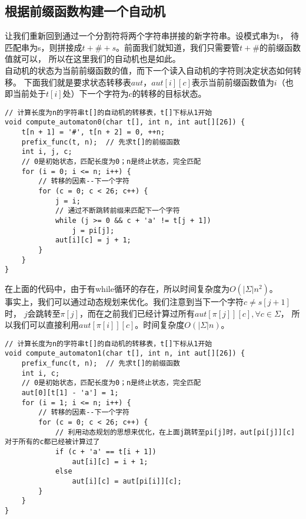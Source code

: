     \subsection{根据前缀函数构建一个自动机}
        让我们重新回到通过一个分割符将两个字符串拼接的新字符串。设模式串为t，
        待匹配串为s，则拼接成$t+\#+s$。前面我们就知道，我们只需要管$t+\#$的前缀函数值就可以，
        所以在这里我们的自动机也是如此。\\
        自动机的状态为当前前缀函数的值，而下一个读入自动机的字符则决定状态如何转移。
        下面我们就是要求状态转移表$aut$，$aut[i][c]$表示当前前缀函数值为$i$（也
        即当前处于$t[i]$处）下一个字符为$c$的转移的目标状态。
        \begin{lstlisting}
// 计算长度为n的字符串t[]的自动机的转移表，t[]下标从1开始
void compute_automaton0(char t[], int n, int aut[][26]) {
    t[n + 1] = '#', t[n + 2] = 0, ++n;
    prefix_func(t, n);  // 先求t[]的前缀函数
    int i, j, c;
    // 0是初始状态，匹配长度为0；n是终止状态，完全匹配
    for (i = 0; i <= n; i++) {
        // 转移的因素--下一个字符
        for (c = 0; c < 26; c++) {
            j = i;
            // 通过不断跳转前缀来匹配下一个字符
            while (j >= 0 && c + 'a' != t[j + 1])
                j = pi[j];
            aut[i][c] = j + 1;
        }
    }
}
        \end{lstlisting}
        在上面的代码中，由于有while循环的存在，所以时间复杂度为$O(|\Sigma|n^2)$。\\
        事实上，我们可以通过动态规划来优化。我们注意到当下一个字符$c \neq s[j+1]$时，
        $j$会跳转至$\pi[j]$，而在之前我们已经计算过所有$aut[\pi[j]][c],\forall c \in \Sigma$，
        所以我们可以直接利用$aut[\pi[i]][c]$。时间复杂度$O(|\Sigma|n)$。
        \begin{lstlisting}
// 计算长度为n的字符串t[]的自动机的转移表，t[]下标从1开始
void compute_automaton1(char t[], int n, int aut[][26]) {
    prefix_func(t, n);  // 先求t[]的前缀函数
    int i, c;
    // 0是初始状态，匹配长度为0；n是终止状态，完全匹配
    aut[0][t[1] - 'a'] = 1;
    for (i = 1; i <= n; i++) {
        // 转移的因素--下一个字符
        for (c = 0; c < 26; c++) {
            // 利用动态规划的思想来优化，在上面j跳转至pi[j]时，aut[pi[j]][c]对于所有的c都已经被计算过了
            if (c + 'a' == t[i + 1])
                aut[i][c] = i + 1;
            else
                aut[i][c] = aut[pi[i]][c];
        }
    }
}
        \end{lstlisting}
